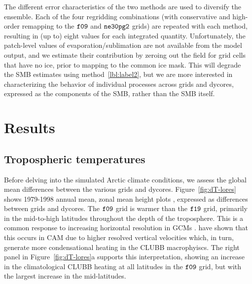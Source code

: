 \documentclass[draft]{agujournal2019}
\begin{document}
The different error characteristics of the two methods are used to {\color{blue}{further}} diversify the ensemble. Each of the four regridding combinations (with conservative and high-order remapping to the $\tt f09$ and $\tt ne30pg2$ grids) are repeated with each method, resulting in (up to) eight values for each integrated quantity. Unfortunately, the patch-level values of evaporation/sublimation are not available from the model output, and we estimate their contribution by zeroing out the field for grid cells that have no ice, prior to mapping to the common ice mask. This will degrade the SMB estimates using method~\ref{lbl:label2}, but we are more interested in characterizing the behavior of individual processes across grids and dycores, expressed as the components of the SMB, rather than the SMB itself.

\section{Results}\label{sec:results}

\subsection{Tropospheric temperatures}

Before delving into the simulated Arctic climate conditions, we assess the global mean differences between the various grids and dycores. Figure~\ref{fig:dT-lores} shows 1979-1998 annual mean, zonal mean height plots {\color{blue}{of temperature}}, expressed as differences between {} grids and dycores. The $\tt f09$ grid is warmer than the $\tt f19$ grid, primarily in the mid-to-high latitudes throughout the depth of the troposphere. This is a common response to increasing horizontal resolution in GCMs \cite{PS2002CD,RETAL2006JC}.  have shown that this occurs in CAM due to higher resolved vertical velocities which, in turn, generate more condensational heating in the CLUBB macrophyiscs. The right panel in Figure~\ref{fig:dT-lores}a supports this interpretation, showing an increase in the climatological CLUBB heating at all latitudes in the $\tt f09$ grid, but with the largest increase in the mid-latitudes.
\end{document}
